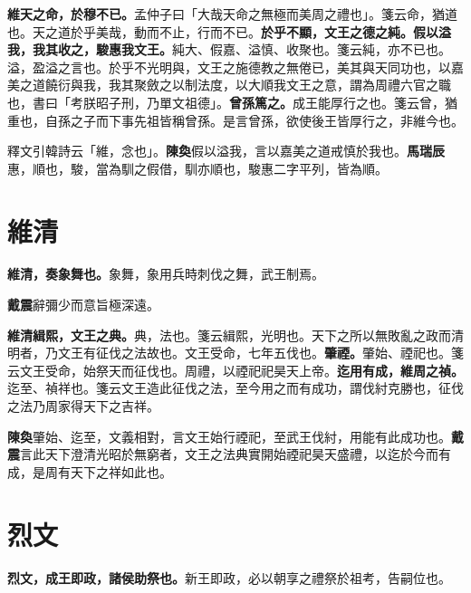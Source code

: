 \textbf{維天之命，於穆不已。}{\footnotesize 孟仲子曰「大哉天命之無極而美周之禮也」。箋云命，猶道也。天之道於乎美哉，動而不止，行而不已。}\textbf{於乎不顯，文王之德之純。假以溢我，我其收之，駿惠我文王。}{\footnotesize 純大、假嘉、溢慎、收聚也。箋云純，亦不已也。溢，盈溢之言也。於乎不光明與，文王之施德教之無倦已，美其與天同功也，以嘉美之道饒衍與我，我其聚斂之以制法度，以大順我文王之意，謂為周禮六官之職也，書曰「考朕昭子刑，乃單文祖德」。}\textbf{曾孫篤之。}{\footnotesize 成王能厚行之也。箋云曾，猶重也，自孫之子而下事先祖皆稱曾孫。是言曾孫，欲使後王皆厚行之，非維今也。}

\begin{quoting}釋文引韓詩云「維，念也」。\textbf{陳奐}假以溢我，言以嘉美之道戒慎於我也。\textbf{馬瑞辰}惠，順也，駿，當為馴之假借，馴亦順也，駿惠二字平列，皆為順。\end{quoting}

\section{維清}


\textbf{維清，奏象舞也。}{\footnotesize 象舞，象用兵時刺伐之舞，武王制焉。}

\begin{quoting}\textbf{戴震}辭彌少而意旨極深遠。\end{quoting}

\textbf{維清緝熙，文王之典。}{\footnotesize 典，法也。箋云緝熙，光明也。天下之所以無敗亂之政而清明者，乃文王有征伐之法故也。文王受命，七年五伐也。}\textbf{肇禋。}{\footnotesize 肇始、禋祀也。箋云文王受命，始祭天而征伐也。周禮，以禋祀祀昊天上帝。}\textbf{迄用有成，維周之禎。}{\footnotesize 迄至、禎祥也。箋云文王造此征伐之法，至今用之而有成功，謂伐紂克勝也，征伐之法乃周家得天下之吉祥。}

\begin{quoting}\textbf{陳奐}肇始、迄至，文義相對，言文王始行禋祀，至武王伐紂，用能有此成功也。\textbf{戴震}言此天下澄清光昭於無窮者，文王之法典實開始禋祀昊天盛禮，以迄於今而有成，是周有天下之祥如此也。\end{quoting}

\section{烈文}


\textbf{烈文，成王即政，諸侯助祭也。}{\footnotesize 新王即政，必以朝享之禮祭於祖考，告嗣位也。}

